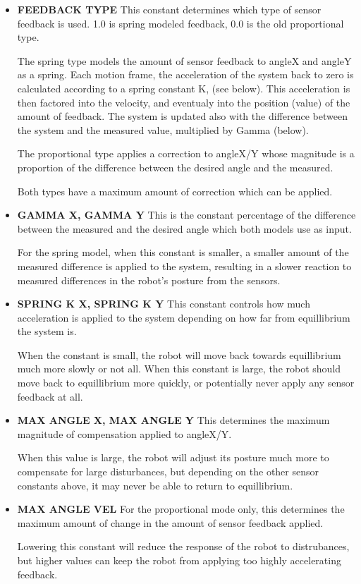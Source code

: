 \documentclass[11pt]{article}
\begin{document}
\begin{itemize}
\item {\bf FEEDBACK TYPE} This constant determines which type of sensor
feedback is used.  1.0 is spring modeled feedback, 0.0 is the old proportional
type.

The spring type models the amount of sensor feedback to angleX and angleY
as  a spring. Each motion frame, the acceleration of the system back to zero
is calculated according to a spring constant K, (see below).
This acceleration is then
factored into the velocity, and eventualy into the position (value) of the
amount of feedback.  The system is updated also with the difference between
the system and the measured value, multiplied by Gamma (below).

The proportional type applies a correction to angleX/Y whose magnitude is
a proportion of the difference between the desired angle and the measured.

Both types have a maximum amount of correction which can be applied.
\item {\bf GAMMA X, GAMMA Y} This is the constant percentage of the difference
between the measured and the desired angle which both models use as input.

For the spring model, when this constant is smaller, a smaller amount of
the measured difference is applied to the system, resulting in a slower
reaction to measured differences in the robot's posture from the sensors.

\item {\bf SPRING K X, SPRING K Y} This constant controls how much acceleration
is applied to the system depending on how far from equillibrium the system is.

When the constant is small, the robot will move back towards equillibrium much
more slowly or not all. When this constant is large, the robot should move
back to equillibrium more quickly, or potentially never apply any sensor
feedback at all.
\item {\bf MAX ANGLE X, MAX ANGLE Y} This determines the maximum magnitude
of compensation applied to angleX/Y.

When this value is large, the robot
will adjust its posture much more to compensate for large disturbances, but
depending on the other sensor constants above, it may never be able to
return to equillibrium.
\item {\bf MAX ANGLE VEL}
For the proportional mode only, this determines the maximum amount of change
in the amount of sensor feedback applied.

Lowering this constant will reduce the response of the robot to distrubances,
but higher values can keep the robot from applying too highly accelerating
feedback.
\end{itemize}
\end{document}
